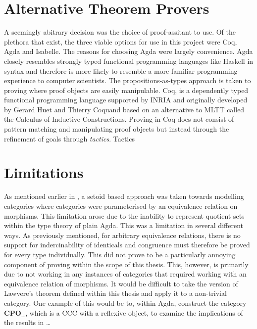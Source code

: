 
\section{Alternative Theorem Provers}
\label{sec:altthmprov}
A seemingly abitrary decision was the choice of proof-assitant to use. Of the
plethora that exist, the three viable options for use in this project were Coq,
Agda and Isabelle. The reasons for choosing Agda were largely convenience. Agda
closely resembles  strongly typed functional programming languages like Haskell
in syntax and therefore is more likely to resemble a more familiar programming
experience to computer scientists. The propositions-as-types approach is taken
to proving where proof objects are easily manipulable. Coq, is a dependently
typed functional programming language supported by INRIA and originally
developed by Gerard Huet and Thierry Coquand based on an alternative to MLTT
called the Calculus of Inductive Constructions. Proving in Coq does not consist
of pattern matching and manipulating proof objects but instead through the
refinement of goals through \textit{tactics}. Tactics

\section{Limitations}
\label{section:limitations}
As mentioned earlier in , a setoid based approach was taken towards
modelling categories where categories were parameterised by an equivalence
relation on morphisms. This limitation arose due to the inability to represent
quotient sets within the type theory of plain Agda. This was a limitation in
several different ways. As previously mentioned, for arbitrary equivalence
relations, there is no support for indercinability of identicals and congruence
must therefore be proved for every type individually. This did not prove to be a
particularly annoying component of proving within the scope of this thesis.
This, however, is primarily due to not working in any instances of categories
that required working with an equivalence relation of morphisms. It would be
difficult to take the version of Lawvere's theorem defined within this thesis
and apply it to a non-trivial category. One example of this would be to, within
Agda, construct the category $\bm{CPO}_{\bot}$, which is a CCC with a reflexive
object, to examine the implications of the results in \ldots{}


